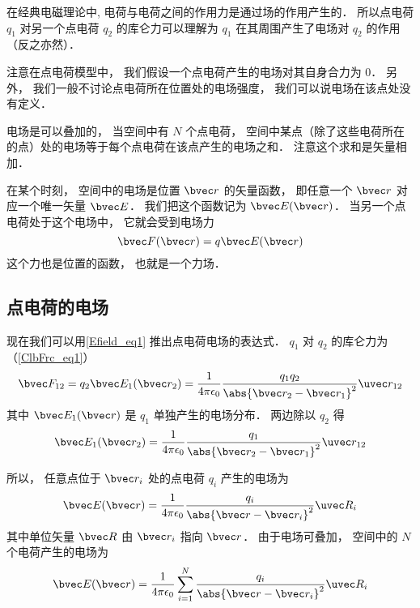 
在经典电磁理论中, 电荷与电荷之间的作用力是通过场的作用产生的． 所以点电荷 $q_1$ 对另一个点电荷 $q_2$ 的库仑力可以理解为 $q_1$ 在其周围产生了电场对 $q_2$ 的作用（反之亦然）．

注意在点电荷模型中， 我们假设一个点电荷产生的电场对其自身合力为 0． 另外， 我们一般不讨论点电荷所在位置处的电场强度， 我们可以说电场在该点处没有定义．

电场是可以叠加的， 当空间中有 $N$ 个点电荷， 空间中某点（除了这些电荷所在的点）处的电场等于每个点电荷在该点产生的电场之和． 注意这个求和是矢量相加．

在某个时刻， 空间中的电场是位置 $\bvec r$ 的矢量函数， 即任意一个 $\bvec r$ 对应一个唯一矢量 $\bvec E$． 我们把这个函数记为 $\bvec E(\bvec r)$． 当另一个点电荷处于这个电场中， 它就会受到电场力
\begin{equation}\label{Efield_eq1}
\bvec F(\bvec r) = q \bvec E(\bvec r)
\end{equation}
这个力也是位置的函数， 也就是一个力场．

\subsection{点电荷的电场}
现在我们可以用\autoref{Efield_eq1} 推出点电荷电场的表达式． $q_1$ 对 $q_2$ 的库仑力为（\autoref{ClbFrc_eq1}）
\begin{equation}\label{Efield_eq3}
\bvec F_{12} = q_2 \bvec E_1(\bvec r_2) = \frac{1}{4\pi\epsilon_0}\frac{q_1 q_2}{\abs{\bvec r_2 - \bvec r_1}^2} \uvec r_{12}
\end{equation}
其中 $\bvec E_1(\bvec r)$ 是 $q_1$ 单独产生的电场分布． 两边除以 $q_2$ 得
\begin{equation}
\bvec E_1(\bvec r_2) = \frac{1}{4\pi\epsilon_0}\frac{q_1}{\abs{\bvec r_2 - \bvec r_1}^2} \uvec r_{12}
\end{equation}

所以， 任意点位于 $\bvec r_i$ 处的点电荷 $q_i$ 产生的电场为
\begin{equation}\label{Efield_eq4}
\bvec E(\bvec r) = \frac{1}{4\pi\epsilon_0}\frac{q_i}{\abs{\bvec r - \bvec r_i}^2} \uvec R_i
\end{equation}
其中单位矢量 $\bvec R$ 由 $\bvec r_i$ 指向 $\bvec r$． 由于电场可叠加， 空间中的 $N$ 个电荷产生的电场为
\begin{equation}\label{Efield_eq2}
\bvec E(\bvec r) = \frac{1}{4\pi\epsilon_0} \sum_{i=1}^N \frac{q_i}{\abs{\bvec r - \bvec r_i}^2} \uvec R_i
\end{equation}

